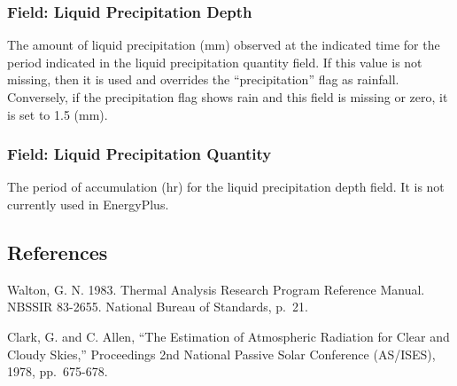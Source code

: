 \subsubsection{Field: Liquid Precipitation Depth}\label{field-liquid-precipitation-depth}

The amount of liquid precipitation (mm) observed at the indicated time for the period indicated in the liquid precipitation quantity field. If this value is not missing, then it is used and overrides the ``precipitation'' flag as rainfall. Conversely, if the precipitation flag shows rain and this field is missing or zero, it is set to 1.5 (mm).

\subsubsection{Field: Liquid Precipitation Quantity}\label{field-liquid-precipitation-quantity}

The period of accumulation (hr) for the liquid precipitation depth field. It is not currently used in EnergyPlus.

\subsection{References}\label{references}

Walton, G. N. 1983. Thermal Analysis Research Program Reference Manual. NBSSIR 83-2655. National Bureau of Standards, p.~21.

Clark, G. and C. Allen, ``The Estimation of Atmospheric Radiation for Clear and Cloudy Skies,'' Proceedings 2nd National Passive Solar Conference (AS/ISES), 1978, pp.~675-678.

